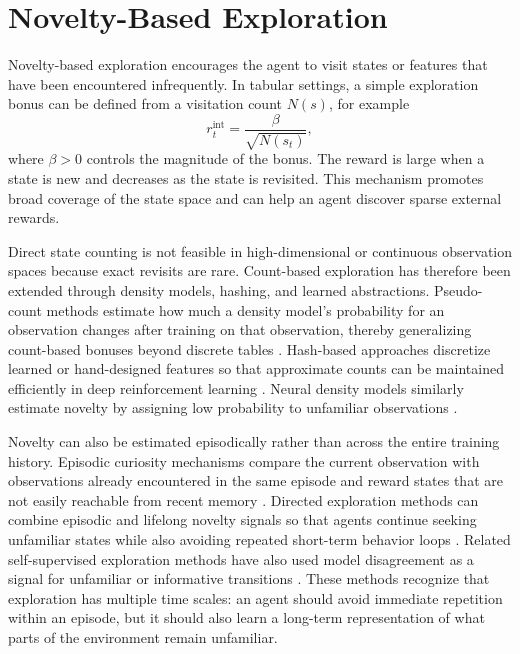 \section{Novelty-Based Exploration}
\label{sec:novelty_based_exploration}

Novelty-based exploration encourages the agent to visit states or features that have been encountered infrequently.
In tabular settings, a simple exploration bonus can be defined from a visitation count $N(s)$, for example
\begin{equation}
    r_t^{\mathrm{int}} = \frac{\beta}{\sqrt{N(s_t)}},
\end{equation}
where $\beta>0$ controls the magnitude of the bonus.
The reward is large when a state is new and decreases as the state is revisited.
This mechanism promotes broad coverage of the state space and can help an agent discover sparse external rewards.

Direct state counting is not feasible in high-dimensional or continuous observation spaces because exact revisits are rare.
Count-based exploration has therefore been extended through density models, hashing, and learned abstractions.
Pseudo-count methods estimate how much a density model's probability for an observation changes after training on that observation, thereby generalizing count-based bonuses beyond discrete tables \parencite{bellemare-2016}.
Hash-based approaches discretize learned or hand-designed features so that approximate counts can be maintained efficiently in deep reinforcement learning \parencite{tang-2016}.
Neural density models similarly estimate novelty by assigning low probability to unfamiliar observations \parencite{ostrovski-2017}.

Novelty can also be estimated episodically rather than across the entire training history.
Episodic curiosity mechanisms compare the current observation with observations already encountered in the same episode and reward states that are not easily reachable from recent memory \parencite{savinov-2018}.
Directed exploration methods can combine episodic and lifelong novelty signals so that agents continue seeking unfamiliar states while also avoiding repeated short-term behavior loops \parencite{badia-2020}.
Related self-supervised exploration methods have also used model disagreement as a signal for unfamiliar or informative transitions \parencite{pathak-2019}.
These methods recognize that exploration has multiple time scales: an agent should avoid immediate repetition within an episode, but it should also learn a long-term representation of what parts of the environment remain unfamiliar.

